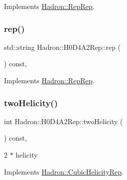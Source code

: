 Implements \mbox{\hyperlink{structHadron_1_1RepRep_ab3213025f6de249f7095892109575fde}{Hadron\+::\+Rep\+Rep}}.

\mbox{\label{structHadron_1_1H0D4A2Rep_ad23c66fe369200d0ff8bebcabf8dfc62}} 
\subsubsection{\texorpdfstring{rep()}{rep()}\hspace{0.1cm}{\footnotesize\ttfamily [5/5]}}
{\footnotesize\ttfamily std\+::string Hadron\+::\+H0\+D4\+A2\+Rep\+::rep (\begin{DoxyParamCaption}{ }\end{DoxyParamCaption}) const\hspace{0.3cm}{\ttfamily [inline]}, {\ttfamily [virtual]}}



Implements \mbox{\hyperlink{structHadron_1_1RepRep_ab3213025f6de249f7095892109575fde}{Hadron\+::\+Rep\+Rep}}.

\mbox{\label{structHadron_1_1H0D4A2Rep_a578e119705a5020872b1e872705ac47e}} 
\subsubsection{\texorpdfstring{twoHelicity()}{twoHelicity()}\hspace{0.1cm}{\footnotesize\ttfamily [1/3]}}
{\footnotesize\ttfamily int Hadron\+::\+H0\+D4\+A2\+Rep\+::two\+Helicity (\begin{DoxyParamCaption}{ }\end{DoxyParamCaption}) const\hspace{0.3cm}{\ttfamily [inline]}, {\ttfamily [virtual]}}

2 $\ast$ helicity 

Implements \mbox{\hyperlink{structHadron_1_1CubicHelicityRep_af507aa56fc2747eacc8cb6c96db31ecc}{Hadron\+::\+Cubic\+Helicity\+Rep}}.

\mbox{\label{structHadron_1_1H0D4A2Rep_a578e119705a5020872b1e872705ac47e}} 
